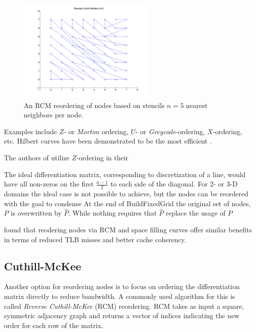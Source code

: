 \documentclass{report}
\begin{document}
\begin{figure}
\centering
\includegraphics[width=0.6\textwidth]{rbffd_methods_content/hashing/node_ordering_rcm_n5.png} 
\caption{An RCM reordering of nodes based on stencils $n=5$ nearest neighbors per node.}
\label{fig:orderings}
\end{figure}


 Examples include $Z$- or \emph{Morton} ordering, $U$- or \emph{Greycode}-ordering, $X$-ordering, etc. Hilbert curves have been demonstrated to be the most efficient \cite{INREFS}. 

The authors of \cite{Goswami2010} utilize $Z$-ordering in their 


The ideal differentiation matrix, corresponding to discretization of a line, would have all non-zeros on the first $\frac{n-1}{2}$ to each side of the diagonal. For 2- or 3-D domains the ideal case is not possible to achieve, but the nodes can be reordered with the goal to condense
At the end of BuildFixedGrid the original set of nodes, $P$ is overwritten by $\hat{P}$. While nothing requires that $\hat{P}$ replace the usage of $P$ 



\cite{MellorCrummey2001} found that reodering nodes via RCM and space filling curves offer similar benefits in terms of reduced TLB misses and better cache coherency. 



\subsection{Cuthill-McKee} 

Another option for reordering nodes is to focus on ordering the differentiation matrix directly to reduce bandwidth. A commonly used algorithm for this is called \emph{Reverse Cuthill-McKee} (RCM) reordering. RCM takes as input a square, symmetric adjacency graph and returns a vector of indices indicating the new order for each row of the matrix. 
\end{document}

